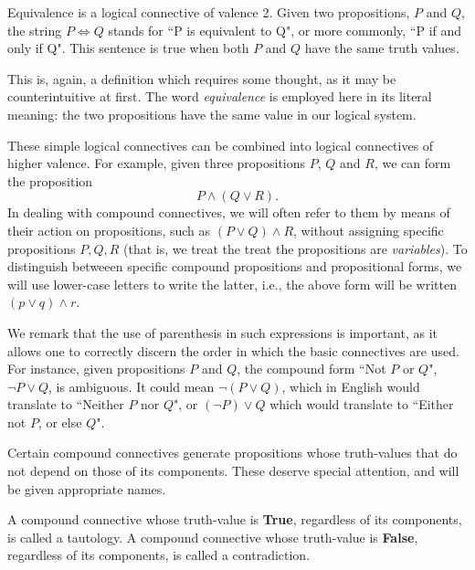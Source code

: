 \begin{definition}
Equivalence is a logical connective of valence 2. Given two propositions, $P$ and $Q$, the string $P \Leftrightarrow Q$ stands for ``P is equivalent to Q", or more commonly, ``P if and only if Q". This sentence is true when both $P$ and $Q$ have the same truth values. 
\end{definition}

This is, again, a definition which requires some thought, as it may be counterintuitive at first. The word \textit{equivalence} is employed here in its literal meaning: the two propositions have the same value in our logical system. 

These simple logical connectives can be combined into logical connectives of higher valence. For example, given three propositions $P$, $Q$ and $R$, we can form the proposition
\begin{equation*}
P \land (Q \lor R).
\end{equation*}
In dealing with compound connectives, we will often refer to them by means of their action on propositions, such as $(P\lor Q) \land R$, without assigning specific propositions $P,Q,R$ (that is, we treat the treat the propositions are \textit{variables}). To distinguish betweeen specific compound propositions and propositional forms, we will use lower-case letters to write the latter, i.e., the above form will be written $(p \lor q) \land r$. 

We remark that the use of parenthesis in such expressions is important, as it allows one to correctly discern the order in which the basic connectives are used.
For instance, given propositions $P$ and $Q$, the compound form ``Not $P$ or $Q$", $\neg P \lor Q$, is ambiguous. It could mean $\neg(P \lor Q)$, which in English would translate to ``Neither $P$ nor $Q$", or $(\neg P) \lor Q$ which would translate to ``Either not $P$, or else $Q$".  

Certain compound connectives generate propositions whose truth-values that do not depend on those of its components. These deserve special attention, and will be given appropriate names. 

\begin{definition}
A compound connective whose truth-value is \textbf{True}, regardless of its components, is called a tautology. A compound connective whose truth-value is \textbf{False}, regardless of its components,  is called a contradiction. 
\end{definition}

